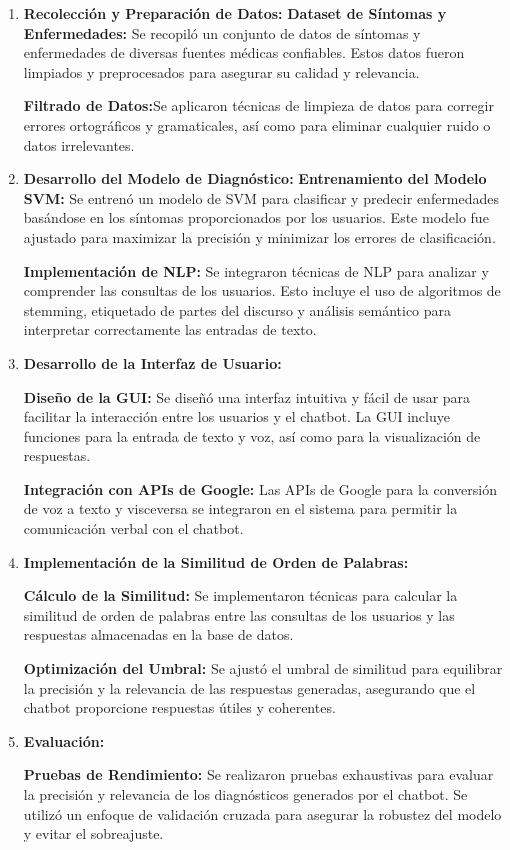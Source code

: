 \begin{enumerate}
	
	\item \textbf{Recolección y Preparación de Datos:}
		\subitem \textbf{Dataset de Síntomas y Enfermedades:} Se recopiló un conjunto de datos de síntomas y enfermedades de diversas fuentes médicas confiables. Estos datos fueron limpiados y preprocesados para asegurar su calidad y relevancia.
		
		\subitem \textbf{Filtrado de Datos:}Se aplicaron técnicas de limpieza de datos para corregir errores ortográficos y gramaticales, así como para eliminar cualquier ruido o datos irrelevantes.
	
	\item \textbf{Desarrollo del Modelo de Diagnóstico:}
		\subitem \textbf{Entrenamiento del Modelo SVM:} Se entrenó un modelo de SVM para clasificar y predecir enfermedades basándose en los síntomas proporcionados por los usuarios. Este modelo fue ajustado para maximizar la precisión y minimizar los errores de clasificación.
		
		\subitem \textbf{Implementación de NLP:} Se integraron técnicas de NLP para analizar y comprender las consultas de los usuarios. Esto incluye el uso de algoritmos de stemming, etiquetado de partes del discurso y análisis semántico para interpretar correctamente las entradas de texto.
	
	\item \textbf{Desarrollo de la Interfaz de Usuario:}
	
		\subitem \textbf{Diseño de la GUI:} Se diseñó una interfaz intuitiva y fácil de usar para facilitar la interacción entre los usuarios y el chatbot. La GUI incluye funciones para la entrada de texto y voz, así como para la visualización de respuestas.
		
		\subitem \textbf{Integración con APIs de Google:} Las APIs de Google para la conversión de voz a texto y visceversa se integraron en el sistema para permitir la comunicación verbal con el chatbot.
	
	\item \textbf{Implementación de la Similitud de Orden de Palabras:}
	
		\subitem \textbf{Cálculo de la Similitud:} Se implementaron técnicas para calcular la similitud de orden de palabras entre las consultas de los usuarios y las respuestas almacenadas en la base de datos.
	
		\subitem \textbf{Optimización del Umbral:} Se ajustó el umbral de similitud para equilibrar la precisión y la relevancia de las respuestas generadas, asegurando que el chatbot proporcione respuestas útiles y coherentes.
			
	\item \textbf{Evaluación:}
	
		\subitem \textbf{Pruebas de Rendimiento:} Se realizaron pruebas exhaustivas para evaluar la precisión y relevancia de los diagnósticos generados por el chatbot. Se utilizó un enfoque de validación cruzada para asegurar la robustez del modelo y evitar el sobreajuste. 
	
\end{enumerate}

